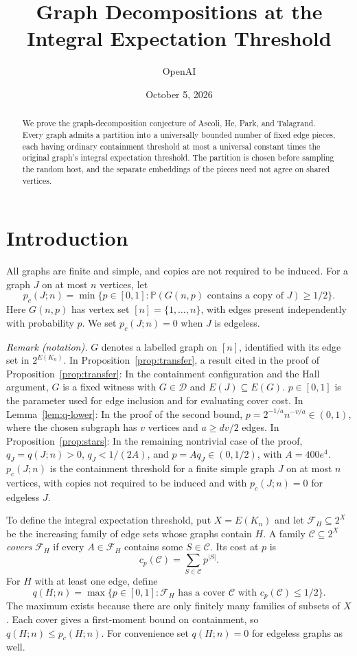 \documentclass[11pt]{article}
\title{Graph Decompositions at the Integral Expectation Threshold}
\author{OpenAI}
\date{October 5, 2026}
\theoremstyle{remark}
\numberwithin{equation}{section}
\newcommand{\Prob}{\mathbb P}
\newcommand{\calD}{\mathcal D}
\newcommand{\calF}{\mathcal F}
\begin{document}
\maketitle

\begin{abstract}
We prove the graph-decomposition conjecture of Ascoli, He, Park,
and Talagrand. Every graph admits a partition into a universally
bounded number of fixed edge pieces, each having ordinary containment
threshold at most a universal constant times the original graph's
integral expectation threshold. The partition is chosen before
sampling the random host, and the separate embeddings of the pieces
need not agree on shared vertices.
\end{abstract}

\section{Introduction}
\label{sec:intro}

All graphs are finite and simple, and copies are not required to
be induced. For a graph $J$ on at most $n$ vertices, let
\[
 p_c(J;n)=\min\{p\in[0,1]:
           \Prob(G(n,p)\text{ contains a copy of }J)\geq1/2\}.
\]
Here $G(n,p)$ has vertex set $[n]=\{1,\ldots,n\}$, with edges
present independently with probability $p$. We set $p_c(J;n)=0$
when $J$ is edgeless.

\noindent\textit{Remark (notation).} $G$ denotes a labelled graph on $[n]$, identified with its edge set in $2^{E(K_n)}$. In Proposition~\ref{prop:transfer}, a result cited in the proof of Proposition~\ref{prop:transfer}: In the containment configuration and the Hall argument, $G$ is a fixed witness with $G\in\calD$ and $E(J)\subseteq E(G)$. $p\in[0,1]$ is the parameter used for edge inclusion and for evaluating cover cost. In Lemma~\ref{lem:q-lower}: In the proof of the second bound, $p=2^{-1/a}n^{-v/a}\in(0,1)$, where the chosen subgraph has $v$ vertices and $a\geq dv/2$ edges. In Proposition~\ref{prop:stars}: In the remaining nontrivial case of the proof, $q_J=q(J;n)>0$, $q_J<1/(2A)$, and $p=Aq_J\in(0,1/2)$, with $A=400e^4$. $p_c(J;n)$ is the containment threshold for a finite simple graph $J$ on at most $n$ vertices, with copies not required to be induced and with $p_c(J;n)=0$ for edgeless $J$.


To define the integral expectation threshold, put $X=E(K_n)$ and
let $\calF_H\subseteq2^X$ be the increasing family of edge sets
whose graphs contain $H$. A family $\mathcal C\subseteq2^X$
\emph{covers} $\calF_H$ if every $A\in\calF_H$ contains some
$S\in\mathcal C$. Its cost at $p$ is
\[
 c_p(\mathcal C)=\sum_{S\in\mathcal C}p^{|S|}.
\]
For $H$ with at least one edge, define
\begin{equation}\label{eq:q-definition}
 q(H;n)=\max\{p\in[0,1]:
    \calF_H\text{ has a cover }\mathcal C
    \text{ with }c_p(\mathcal C)\leq1/2\}.
\end{equation}
The maximum exists because there are only finitely many families
of subsets of $X$. Each cover gives a first-moment bound on
containment, so $q(H;n)\leq p_c(H;n)$. For convenience set
$q(H;n)=0$ for edgeless graphs as well.
\end{document}
